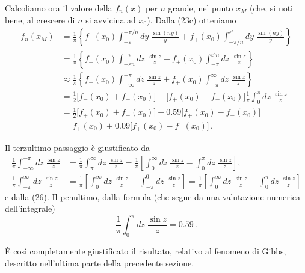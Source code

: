 \documentclass[11pt, a4paper]{book}
\numberwithin{equation}{section}
\begin{document}
Calcoliamo ora il valore della $f_n(x)$ per $n$ grande, nel punto $x_M$ (che, si noti bene, al crescere di $n$ si avvicina ad $x_0$). Dalla (23c) otteniamo
\begin{align}
  f_n(x_M) &= \frac{1}{\pi}\left\{f_-(x_0)\int_{-\varepsilon}^{-\pi/n} dy\;\frac{\sin(ny)}{y}
    + f_+(x_0)\int_{-\pi/n}^{\varepsilon'} dy\;\frac{\sin(ny)}{y}\right\} \tag{30a}\\
  &= \frac{1}{\pi}\left\{f_-(x_0)\int_{-\varepsilon n}^{-\pi} dz\;\frac{\sin z}{z}
    + f_+(x_0)\int_{-\pi}^{\varepsilon' n} dz\;\frac{\sin z}{z}\right\} \tag{30b}\\
  &\approx \frac{1}{\pi}\left\{f_-(x_0)\int_{-\infty}^{-\pi} dz\;\frac{\sin z}{z}
    + f_+(x_0)\int_{-\pi}^{\infty} dz\;\frac{\sin z}{z}\right\} \tag{30c}\\
  &= \tfrac{1}{2}\bigl[f_-(x_0)+f_+(x_0)\bigr]
    + \bigl[f_+(x_0)-f_-(x_0)\bigr]\frac{1}{\pi}\int_{0}^{\pi} dz\;\frac{\sin z}{z} \tag{30d}\\
  &= \tfrac{1}{2}\bigl[f_+(x_0)+f_-(x_0)\bigr] + 0.59\bigl[f_+(x_0)-f_-(x_0)\bigr] \tag{30e}\\
  &= f_+(x_0) + 0.09\bigl[f_+(x_0)-f_-(x_0)\bigr]\,. \tag{30f}
\end{align}

Il terzultimo passaggio è giustificato da
\begin{align*}
  \frac{1}{\pi}\int_{-\infty}^{-\pi} dz\;\frac{\sin z}{z}
  &= \frac{1}{\pi}\int_{\pi}^{\infty} dz\;\frac{\sin z}{z}
  = \frac{1}{\pi}\left[\int_{0}^{\infty} dz\;\frac{\sin z}{z} - \int_{0}^{\pi} dz\;\frac{\sin z}{z}\right],\\
  \frac{1}{\pi}\int_{-\pi}^{\infty} dz\;\frac{\sin z}{z}
  &= \frac{1}{\pi}\left[\int_{0}^{\infty} dz\;\frac{\sin z}{z} + \int_{-\pi}^{0} dz\;\frac{\sin z}{z}\right]
  = \frac{1}{\pi}\left[\int_{0}^{\infty} dz\;\frac{\sin z}{z} + \int_{0}^{\pi} dz\;\frac{\sin z}{z}\right]
\end{align*}
e dalla (26). Il penultimo, dalla formula (che segue da una valutazione numerica dell'integrale)
\[
  \frac{1}{\pi}\int_{0}^{\pi} dz\;\frac{\sin z}{z} = 0.59\,.
\]

È così completamente giustificato il risultato, relativo al fenomeno di Gibbs, descritto nell'ultima parte della precedente sezione.
\end{document}
